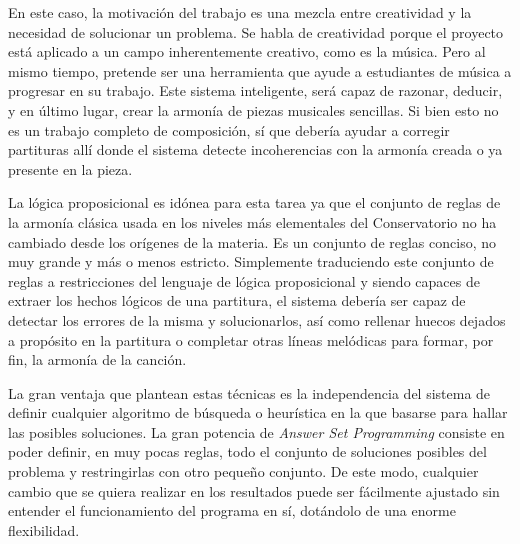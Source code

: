  En este caso, la motivación del trabajo es una mezcla entre creatividad y la necesidad de solucionar un problema. Se habla de creatividad porque el proyecto está aplicado a un campo inherentemente creativo, como es la música. Pero al mismo tiempo, pretende ser una herramienta que ayude a estudiantes de música a progresar en su trabajo. Este sistema inteligente, será capaz de razonar, deducir, y en último lugar, crear la armonía de piezas musicales sencillas. Si bien esto no es un trabajo completo de composición, sí que debería ayudar a corregir partituras allí donde el sistema detecte incoherencias con la armonía creada o ya presente en la pieza. 
 
La lógica proposicional es idónea para esta tarea ya que el conjunto de reglas de la armonía clásica usada en los niveles más elementales del Conservatorio no ha cambiado desde los orígenes de la materia. Es un conjunto de reglas conciso, no muy grande y más o menos estricto. Simplemente traduciendo este conjunto de reglas a restricciones del lenguaje de lógica proposicional y siendo capaces de extraer los hechos lógicos de una partitura, el sistema debería ser capaz de detectar los errores de la misma y solucionarlos, así como rellenar huecos dejados a propósito en la partitura o completar otras líneas melódicas para formar, por fin, la armonía de la canción.

La gran ventaja que plantean estas técnicas es la independencia del sistema de definir cualquier algoritmo de búsqueda o heurística en la que basarse para hallar las posibles soluciones. La gran potencia de \textit{Answer Set Programming} consiste en poder definir, en muy pocas reglas, todo el conjunto de soluciones posibles del problema y restringirlas con otro pequeño conjunto. De este modo, cualquier cambio que se quiera realizar en los resultados puede ser fácilmente ajustado sin entender el funcionamiento del programa en sí, dotándolo de una enorme flexibilidad.

 
